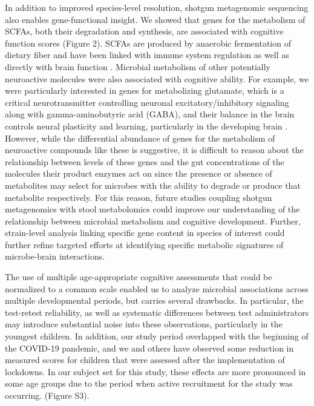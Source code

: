 \documentclass{article}
\begin{document}
In addition to improved species-level resolution, shotgun metagenomic
sequencing also enables gene-functional insight. We showed that
genes for the metabolism of SCFAs, both their degradation and synthesis,
are associated with cognitive function scores (Figure 2). 
SCFAs are produced by anaerobic fermentation of dietary fiber
and have been linked with immune system regulation as well as directly
with brain function \cite{dalileRoleShortchainFatty2019}.
Microbial metabolism of other potentially neuroactive molecules
were also associated with cognitive ability. For example, we were
particularly interested in genes for metabolizing glutamate, which is a
critical neurotransmitter controlling neuronal excitatory/inhibitory
signaling along with gamma-aminobutyric acid (GABA), and their balance
in the brain controls neural plasticity and learning, particularly in
the developing brain \cite{cohenkadoshLinkingGABAGlutamate2015,palomo-buitragoGlutamateInteractionsObesity2019}.
However, while the
differential abundance of genes for the metabolism of neuroactive
compounds like these is suggestive, it is difficult to reason about the
relationship between levels of these genes and the gut concentrations of
the molecules their product enzymes act on since the presence or absence
of metabolites may select for microbes with the ability to degrade
or produce that metabolite respectively.
For this reason, future studies coupling shotgun
metagenomics with stool metabolomics could improve our understanding of
the relationship between microbial metabolism and cognitive development.
Further, strain-level analysis linking specific gene content in species
of interest could further refine targeted efforts at identifying
specific metabolic signatures of microbe-brain interactions.

The use of multiple age-appropriate cognitive assessments that could be
normalized to a common scale enabled us to analyze microbial
associations across multiple developmental periods, but carries several
drawbacks. In particular, the test-retest reliability, as well as
systematic differences between test administrators may introduce
substantial noise into these observations, particularly in the youngest
children. In addition, our study period overlapped with the beginning of
the COVID-19 pandemic, and we and others have observed some reduction in
measured scores for children that were assessed after the implementation
of lockdowns. In our subject set for this study, these effects are more
pronounced in some age groups due to the period when active recruitment for
the study was occurring.
\cite{blackwellYouthWellbeingCOVID192022,deoniImpactCOVID19Pandemic2021}
(Figure S3).
\end{document}
